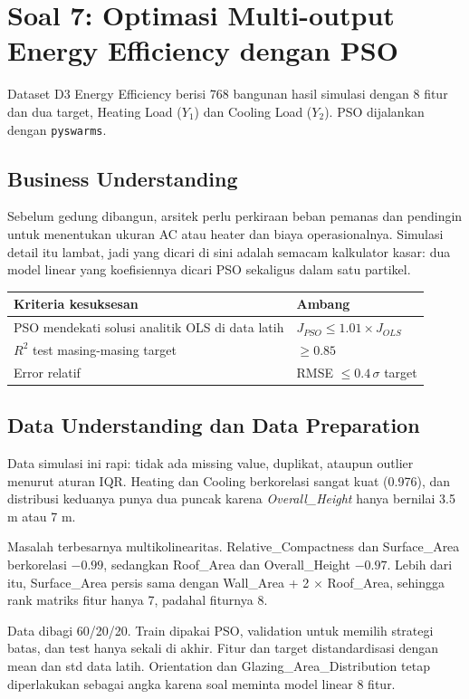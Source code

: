 \newpage
\section{Soal 7: Optimasi Multi-output Energy Efficiency dengan PSO}

Dataset D3 Energy Efficiency berisi 768 bangunan hasil simulasi dengan 8 fitur dan dua target, Heating Load ($Y_1$) dan Cooling Load ($Y_2$). PSO dijalankan dengan \texttt{pyswarms}.

\subsection{Business Understanding}
Sebelum gedung dibangun, arsitek perlu perkiraan beban pemanas dan pendingin untuk menentukan ukuran AC atau heater dan biaya operasionalnya. Simulasi detail itu lambat, jadi yang dicari di sini adalah semacam kalkulator kasar: dua model linear yang koefisiennya dicari PSO sekaligus dalam satu partikel.

\begin{tabularx}{\textwidth}{@{}LL@{}}
\toprule
\textbf{Kriteria kesuksesan} & \textbf{Ambang} \\
\midrule
PSO mendekati solusi analitik OLS di data latih & $J_{PSO} \leq 1.01 \times J_{OLS}$ \\
$R^2$ test masing-masing target & $\geq 0.85$ \\
Error relatif & RMSE $\leq 0.4\,\sigma$ target \\
\bottomrule
\end{tabularx}

\subsection{Data Understanding dan Data Preparation}
Data simulasi ini rapi: tidak ada missing value, duplikat, ataupun outlier menurut aturan IQR. Heating dan Cooling berkorelasi sangat kuat (0.976), dan distribusi keduanya punya dua puncak karena \emph{Overall\_Height} hanya bernilai 3.5 m atau 7 m.

Masalah terbesarnya multikolinearitas. Relative\_Compactness dan Surface\_Area berkorelasi $-0.99$, sedangkan Roof\_Area dan Overall\_Height $-0.97$. Lebih dari itu, Surface\_Area persis sama dengan Wall\_Area + 2 $\times$ Roof\_Area, sehingga rank matriks fitur hanya 7, padahal fiturnya 8.

Data dibagi 60/20/20. Train dipakai PSO, validation untuk memilih strategi batas, dan test hanya sekali di akhir. Fitur dan target distandardisasi dengan mean dan std data latih. Orientation dan Glazing\_Area\_Distribution tetap diperlakukan sebagai angka karena soal meminta model linear 8 fitur.


